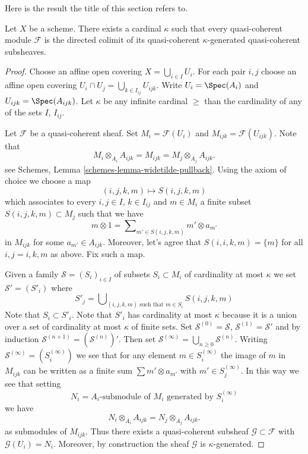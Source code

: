 \noindent
Here is the result the title of this section refers to.

\begin{lemma}
\label{lemma-colimit-kappa}
Let $X$ be a scheme. There exists a cardinal $\kappa$ such that
every quasi-coherent module $\mathcal{F}$ is the directed colimit
of its quasi-coherent $\kappa$-generated quasi-coherent subsheaves.
\end{lemma}

\begin{proof}
Choose an affine open covering $X = \bigcup_{i \in I} U_i$. For each pair
$i, j$ choose an affine open covering
$U_i \cap U_j = \bigcup_{k \in I_{ij}} U_{ijk}$.
Write $U_i = \Spec(A_i)$ and $U_{ijk} = \Spec(A_{ijk})$.
Let $\kappa$ be any infinite cardinal $\geq$ than the cardinality
of any of the sets $I$, $I_{ij}$.

\medskip\noindent
Let $\mathcal{F}$ be a quasi-coherent sheaf. Set $M_i = \mathcal{F}(U_i)$
and $M_{ijk} = \mathcal{F}(U_{ijk})$. Note that
$$
M_i \otimes_{A_i} A_{ijk} = M_{ijk} = M_j \otimes_{A_j} A_{ijk}.
$$
see
Schemes, Lemma \ref{schemes-lemma-widetilde-pullback}.
Using the axiom of choice we choose a map
$$
(i, j, k, m) \mapsto S(i, j, k, m)
$$
which associates to every $i, j \in I$, $k \in I_{ij}$ and $m \in M_i$
a finite subset $S(i, j, k, m) \subset M_j$ such that we have
$$
m \otimes 1 = \sum\nolimits_{m' \in S(i, j, k, m)} m' \otimes a_{m'}
$$
in $M_{ijk}$ for some $a_{m'} \in A_{ijk}$. Moreover, let's agree
that $S(i, i, k, m) = \{m\}$ for all $i, j = i, k, m$ as above.
Fix such a map.

\medskip\noindent
Given a family $\mathcal{S} = (S_i)_{i \in I}$ of subsets
$S_i \subset M_i$ of cardinality at most $\kappa$ we set
$\mathcal{S}' = (S'_i)$ where
$$
S'_j = \bigcup\nolimits_{(i, j, k, m)\text{ such that }m \in S_i}
S(i, j, k, m)
$$
Note that $S_i \subset S'_i$. Note that $S'_i$ has cardinality at most
$\kappa$ because it is a union over a set of cardinality at most $\kappa$
of finite sets. Set $\mathcal{S}^{(0)} = \mathcal{S}$,
$\mathcal{S}^{(1)} = \mathcal{S}'$ and by induction
$\mathcal{S}^{(n + 1)} = (\mathcal{S}^{(n)})'$. Then set
$\mathcal{S}^{(\infty)} = \bigcup_{n \geq 0} \mathcal{S}^{(n)}$.
Writing $\mathcal{S}^{(\infty)} = (S^{(\infty)}_i)$ we see that
for any element $m \in S^{(\infty)}_i$ the image of $m$ in
$M_{ijk}$ can be written as a finite sum $\sum m' \otimes a_{m'}$
with $m' \in S_j^{(\infty)}$. In this way we see that setting
$$
N_i = A_i\text{-submodule of }M_i\text{ generated by }S^{(\infty)}_i
$$
we have
$$
N_i \otimes_{A_i} A_{ijk} = N_j \otimes_{A_j} A_{ijk}.
$$
as submodules of $M_{ijk}$. Thus there exists a quasi-coherent subsheaf
$\mathcal{G} \subset \mathcal{F}$ with $\mathcal{G}(U_i) = N_i$.
Moreover, by construction the sheaf $\mathcal{G}$ is $\kappa$-generated.


\end{proof}
